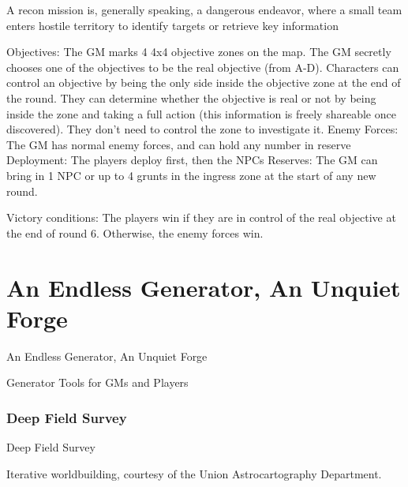 A recon mission is, generally speaking, a dangerous endeavor, where a small team enters hostile  
territory to identify targets or retrieve key information  

Objectives: The GM marks 4 4x4 objective zones on the map. The GM secretly chooses one of  
the objectives to be the real objective (from A-D). Characters can control an objective by being the  
only side inside the objective zone at the end of the round. They can determine whether the  
objective is real or not by being inside the zone and taking a full action (this information is freely  
shareable once discovered). They don’t need to control the zone to investigate it.  
Enemy Forces: The GM has normal enemy forces, and can hold any number in reserve  
Deployment: The players deploy first, then the NPCs  
Reserves: The GM can bring in 1 NPC or up to 4 grunts in the ingress zone at the start of any  
new round.  

                                                                                                                        


Victory conditions: The players win if they are in control of the real objective at the end of round  
6. Otherwise, the enemy forces win.  

\chapter{An Endless Generator, An Unquiet Forge}

An Endless Generator, An Unquiet Forge   

Generator Tools for GMs and Players   

\subsection{Deep Field Survey }

Deep Field Survey   

Iterative worldbuilding, courtesy of the Union Astrocartography Department.   

